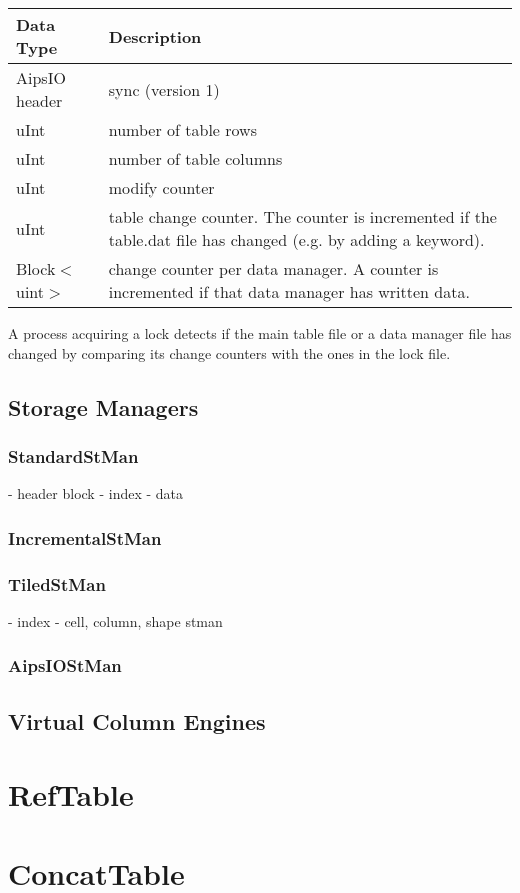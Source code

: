 \vspace{0.15in}
\begin{tabular}{|l|p{13cm}|} \hline
  Data Type & Description \\ \hline\hline
  AipsIO header & sync (version 1) \\
  uInt & number of table rows \\
  uInt & number of table columns \\
  uInt & modify counter \\
  uInt & table change counter. The counter is incremented if the
  table.dat file has changed (e.g. by adding a keyword). \\
  Block$<$uint$>$ & change counter per data manager. A counter is
  incremented if that data manager has written data. \\
  \hline
\end{tabular}
\vspace{0.15in}

A process acquiring a lock detects if the main table file or a data
manager file has changed by comparing its change counters with the
ones in the lock file.

\subsection{Storage Managers}

\subsubsection{StandardStMan}
- header block
- index
- data

\subsubsection{IncrementalStMan}

\subsubsection{TiledStMan}
- index
- cell, column, shape stman

\subsubsection {AipsIOStMan}

\subsection{Virtual Column Engines}

\section{RefTable}

\section{ConcatTable}
